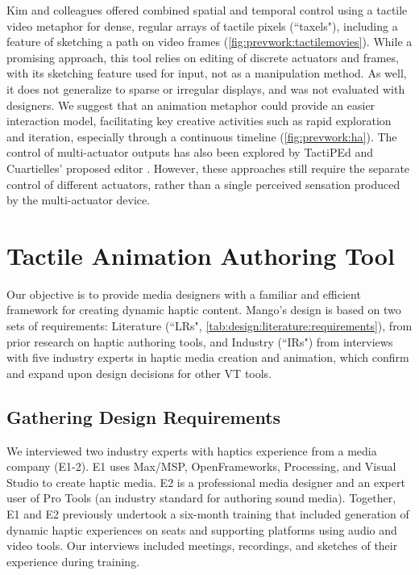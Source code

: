 Kim and colleagues offered combined spatial and temporal control using a tactile video metaphor for dense, regular arrays of tactile pixels (``taxels"), including a feature of sketching a path on video frames \cite{Kim2009} (\autoref{fig:prevwork:tactilemovies}).
While a promising approach, this tool relies on editing of discrete actuators and frames, with its sketching feature used for input, not as a manipulation method.
As well, it does not generalize to sparse or irregular displays, and was not evaluated with designers.
We suggest that an animation metaphor could provide an easier interaction model, facilitating key creative activities such as rapid exploration and iteration, especially through a continuous timeline (\autoref{fig:prevwork:ha}).
The control of multi-actuator outputs has also been explored by TactiPEd \cite{Paneels2013} and Cuartielles' proposed editor \cite{Cuartielles2012}.
However, these approaches still require the separate control of different actuators, rather than a single perceived sensation produced by the multi-actuator device. 





%
%
\section{Tactile Animation Authoring Tool}
Our objective is to provide media designers with a familiar and efficient %
framework for creating dynamic haptic content. Mango's design is based on two sets of requirements: Literature  (``LRs", \autoref{tab:design:literature:requirements}), from prior research on haptic authoring tools, and Industry (``IRs") from interviews with five industry experts in haptic media creation and animation, which confirm and expand upon design decisions for other VT tools.

\subsection{Gathering Design Requirements}
We interviewed two industry experts with haptics experience from a media company (E1-2).
E1 %
uses Max/MSP, OpenFrameworks, Processing, and Visual Studio to create haptic media.
E2 is a professional media designer and an expert user of Pro Tools (an industry standard for authoring sound media).  Together, E1 and E2 previously undertook 
a six-month training that included generation of dynamic haptic experiences on seats and supporting platforms using audio and video tools.
Our interviews included meetings, recordings, and sketches of their experience during training.

